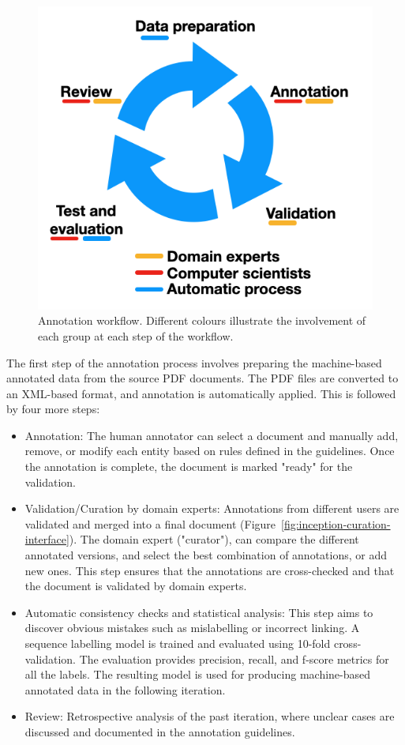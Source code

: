 \begin{figure}[htb]
\centering
  \centering
  \includegraphics[width=0.5\linewidth]{figures/supermat/Fig2.png}
  \caption{Annotation workflow. Different colours illustrate the involvement of each group at each step of the workflow.}
  \label{fig:schema-comparison-modified-workflow}
\end{figure}

The first step of the annotation process involves preparing the machine-based annotated data from the source PDF documents. 
The PDF files are converted to an XML-based format, and annotation is automatically applied. 
This is followed by four more steps: 

\begin{itemize}
\item Annotation: The human annotator can select a document and manually add, remove, or modify each entity based on rules defined in the guidelines. Once the annotation is complete, the document is marked "ready" for the validation. 

\item Validation/Curation by domain experts: Annotations from different users are validated and merged into a final document (Figure~\ref{fig:inception-curation-interface}). 
The domain expert ("curator"), can compare the different annotated versions, and select the best combination of annotations, or add new ones. 
This step ensures that the annotations are cross-checked and that the document is validated by domain experts.

\item Automatic consistency checks and statistical analysis: This step aims to discover obvious mistakes such as mislabelling or incorrect linking. 
A sequence labelling model is trained and evaluated using 10-fold cross-validation. The evaluation provides precision, recall, and f-score metrics for all the labels.
The resulting model is used for producing machine-based annotated data in the following iteration.

\item Review: Retrospective analysis of the past iteration, where unclear cases are discussed and documented in the annotation guidelines. 

\end{itemize}

